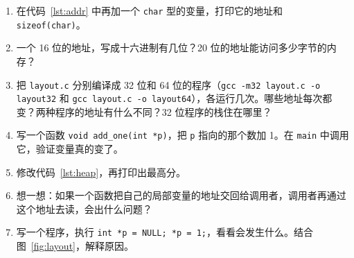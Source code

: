 
\begin{enumerate}
  \item 在代码~\ref{lst:addr} 中再加一个 \texttt{char} 型的变量，打印它的地址和 \texttt{sizeof(char)}。
  \item 一个 16 位的地址，写成十六进制有几位？20 位的地址能访问多少字节的内存？
  \item 把 \texttt{layout.c} 分别编译成 32 位和 64 位的程序（\texttt{gcc -m32 layout.c -o layout32} 和 \texttt{gcc layout.c -o layout64}），各运行几次。哪些地址每次都变？两种程序的地址有什么不同？32 位程序的栈住在哪里？
  \item 写一个函数 \texttt{void add\_one(int *p)}，把 \texttt{p} 指向的那个数加 1。在 \texttt{main} 中调用它，验证变量真的变了。
  \item 修改代码~\ref{lst:heap}，再打印出最高分。
  \item 想一想：如果一个函数把自己的局部变量的地址交回给调用者，调用者再通过这个地址去读，会出什么问题？
  \item 写一个程序，执行 \texttt{int *p = NULL; *p = 1;}，看看会发生什么。结合图~\ref{fig:layout}，解释原因。
\end{enumerate}
